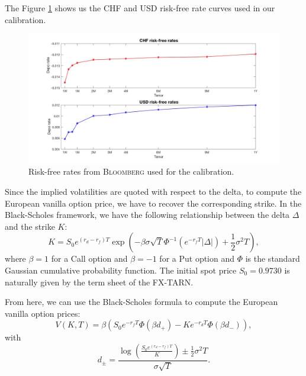 The Figure \ref{fig:calibration:depo} shows us the CHF and USD risk-free rate curves used in our calibration.
\begin{figure}[!htb]
	\includegraphics[width=\textwidth]{gfx/risk-free}
	\caption{Risk-free rates from \textsc{Bloomberg} used for the calibration.}
	\label{fig:calibration:depo}
\end{figure}

Since the implied volatilities are quoted with respect to the delta, to compute the European vanilla option price, we have to recover the corresponding strike. In the Black-Scholes framework, we have the following relationship between the delta $\Delta$ and the strike $K$:
$$K = S_0e^{(r_d-r_f)T}  \exp\left(-\beta \sigma \sqrt{T}\Phi^{-1}\left(e^{-r_f T}  |\Delta|\right) + \frac{1}{2} \sigma^2 T\right),
$$
where $\beta = 1$ for a Call option and $\beta = -1$ for a Put option and $\Phi$  is the standard Gaussian cumulative probability function. The initial spot price $S_0 = 0.9730$ is naturally given by the term sheet of the FX-TARN.

From here, we can use the Black-Scholes formula to compute the European vanilla option prices:
$$V(K,T) = \beta\left(S_0 e^{-r_f T}\Phi(\beta d_+)-Ke^{-r_d T}\Phi(\beta d_-)\right),$$
with
$$d_\pm = \frac{\log\left(\frac{S_0e^{(r_d-r_f)T}}{K}\right)\pm \frac{1}{2}\sigma^2 T}{\sigma \sqrt{T}}.$$

